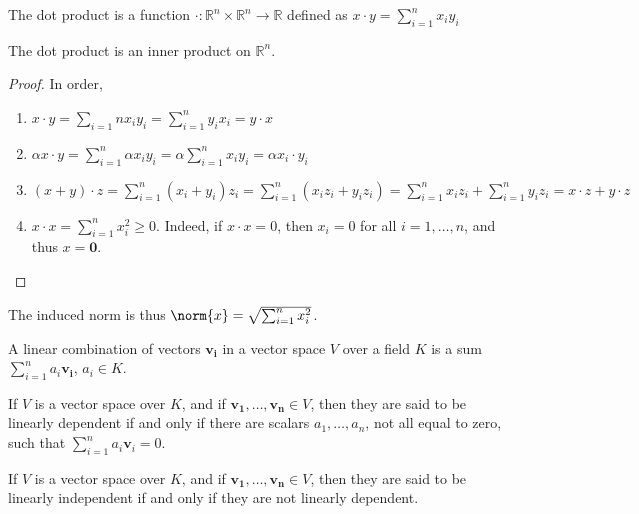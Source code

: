 \documentclass[crop=false,class=article,oneside]{standalone}
\begin{document}
            \begin{definition}
            The dot product is a function $\cdot:\mathbb{R}^n \times \mathbb{R}^n \rightarrow \mathbb{R}$ defined as $x\cdot y = \sum_{i=1}^{n} x_iy_i$
            \end{definition}
            \begin{theorem}
            The dot product is an inner product on $\mathbb{R}^n$.
            \end{theorem}
            \begin{proof}
            In order,
            \begin{enumerate}
            \item $x\cdot y = \sum_{i=1}{n} x_i y_i = \sum_{i=1}^{n} y_i x_i = y\cdot x$
            \item $\alpha x\cdot y = \sum_{i=1}^{n} \alpha x_i y_i = \alpha \sum_{i=1}^{n} x_i y_i = \alpha x_i \cdot y_i$
            \item $(x+y)\cdot z = \sum_{i=1}^{n} (x_i+y_i)z_i = \sum_{i=1}^{n} (x_iz_i +y_i z_i)=\sum_{i=1}^{n}x_i z_i+\sum_{i=1}^{n} y_i z_i = x\cdot z + y\cdot z$
            \item $x\cdot x = \sum_{i=1}^{n} x_i^2 \geq 0$. Indeed, if $x\cdot x = 0$, then $x_i = 0$ for all $i=1,\hdots, n$, and thus $x=\mathbf{0}$.
            \end{enumerate}
            \end{proof}
            \begin{remark}
            The induced norm is thus $\norm{x} = \sqrt{\sum_{i=1}^{n} x_i^2}$.
            \end{remark}
            \begin{definition}
            A linear combination of vectors $\mathbf{v_i}$ in a vector space $V$ over a field $K$ is a sum $\sum_{i=1}^{n} a_i \mathbf{v_i}$, $a_i \in K$.
            \end{definition}
            \begin{definition}
            If $V$ is a vector space over $K$, and if $\mathbf{v_1},\hdots, \mathbf{v_n}\in V$, then they are said to be linearly dependent if and only if there are scalars $a_1,\hdots, a_n$, not all equal to zero, such that $\sum_{i=1}^{n} a_i \mathbf{v}_i = 0$.
            \end{definition}
            \begin{definition}
            If $V$ is a vector space over $K$, and if $\mathbf{v_1},\hdots, \mathbf{v_n}\in V$, then they are said to be linearly independent if and only if they are not linearly dependent.
            \end{definition}
\end{document}
